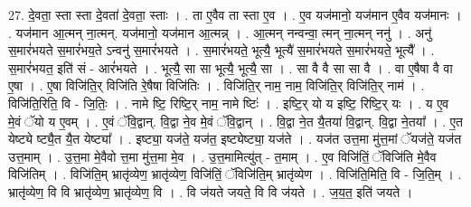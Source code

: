 \documentclass[17pt]{extarticle}
\begin{document}
27. दे॒वता॒ स्ता स्ता दे॒वता॑ दे॒वता॒ स्ताः । . ता ए॒वैव ता स्ता ए॒व । . ए॒व यज॑मानो॒ यज॑मान ए॒वैव यज॑मानः । . यज॑मान आ॒त्मन् ना॒त्मन्. यज॑मानो॒ यज॑मान आ॒त्मन्न् । . आ॒त्मन् नन्वन्वा॒ त्मन् ना॒त्मन् ननु॑ । . अनु॑ स॒मारं॑भयते स॒मारं॑भय॒ते ऽन्वनु॑ स॒मारं॑भयते । . स॒मारं॑भयते॒ भूत्यै॒ भूत्यै॑ स॒मारं॑भयते स॒मारं॑भयते॒ भूत्यै᳚ । . स॒मारं॑भयत॒ इति॑ सं - आरं॑भयते । . भूत्यै॒ सा सा भूत्यै॒ भूत्यै॒ सा । . सा वै वै सा सा वै । . वा ए॒षैषा वै वा ए॒षा । . ए॒षा विजि॑ति॒र् विजि॑ति रे॒षैषा विजि॑तिः । . विजि॑ति॒र् नाम॒ नाम॒ विजि॑ति॒र् विजि॑ति॒र् नाम॑ । . विजि॑ति॒रिति॒ वि - जि॒तिः॒ । . नामे ष्टि॒ रिष्टि॒र् नाम॒ नामे ष्टिः॑ । . इष्टि॒र् यो य इष्टि॒ रिष्टि॒र् यः । . य ए॒व मे॒वं ॅयो य ए॒वम् । . ए॒वं ॅवि॒द्वान्. वि॒द्वा ने॒व मे॒वं ॅवि॒द्वान् । . वि॒द्वा ने॒त यै॒तया॑ वि॒द्वान्. वि॒द्वा ने॒तया᳚ । . ए॒त येष्ट्ये ष्ट्यै॒त यै॒त येष्ट्या᳚ । . इष्ट्या॒ यज॑ते॒ यज॑त॒ इष्ट्येष्ट्या॒ यज॑ते । . यज॑त उत्त॒मा मु॑त्त॒मां ॅयज॑ते॒ यज॑त उत्त॒माम् । . उ॒त्त॒मा मे॒वैवो त्त॒मा मु॑त्त॒मा मे॒व । . उ॒त्त॒मामित्यु॑त् - त॒माम् । . ए॒व विजि॑तिं॒ ॅविजि॑ति मे॒वैव विजि॑तिम् । . विजि॑ति॒म् भ्रातृ॑व्येण॒ भ्रातृ॑व्येण॒ विजि॑तिं॒ ॅविजि॑ति॒म् भ्रातृ॑व्येण । . विजि॑ति॒मिति॒ वि - जि॒ति॒म् । . भ्रातृ॑व्येण॒ वि वि भ्रातृ॑व्येण॒ भ्रातृ॑व्येण॒ वि । . वि ज॑यते जयते॒ वि वि ज॑यते । . ज॒य॒त॒ इति॑ जयते । \newline
\end{document}
